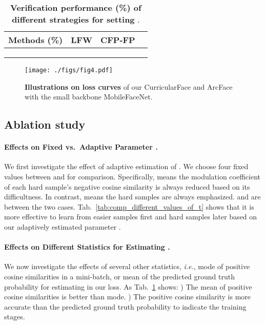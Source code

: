 \documentclass[10pt,twocolumn,letterpaper]{article}
\begin{document}
\begin{table}[t!]
\begin{center}
\small
\caption{\small \textbf{Verification performance (\%) of different strategies for setting }.}
\label{tab:comp_different_strategies_of_t}
\begin{tabular}{l|ccc}
\hline
Methods (\%)           & LFW  & CFP-FP  \\ \hline\hline
   &  &  \\
               &  &   \\
   &  &  \\\hline
\end{tabular}
\end{center}
\end{table}

\begin{figure}[t]
  \centering
  \texttt{[image: ./figs/fig4.pdf]}
\caption{\small
\textbf{Illustrations on loss curves} of our CurricularFace and ArcFace with the small backbone MobileFaceNet.
  }
  \label{fig:small_backbone}
\end{figure}

\subsection{Ablation study}
\paragraph{Effects on Fixed vs.~Adaptive Parameter .}
We first investigate the effect of adaptive estimation of .
We choose four fixed values between  and  for comparison.
Specifically,  means the modulation coefficient  of each hard sample's negative cosine similarity is always reduced based on its difficultness.
In contrast,  means the hard samples are always emphasized.
 and  are between the two cases.
Tab.~\ref{tab:comp_different_values_of_t} shows that it is more effective to learn from easier samples first and hard samples later based on our adaptively estimated parameter .

\paragraph{Effects on Different Statistics for Estimating .}
We now investigate the effects of several other statistics, \textit{i.e.}, mode of positive cosine similarities in a mini-batch, or mean of the predicted ground truth probability for estimating  in our loss.
As Tab.~\ref{tab:comp_different_strategies_of_t} shows: 
) The mean of positive cosine similarities is better than mode.
) The positive cosine similarity is more accurate than the predicted ground truth probability to indicate the training stages.
\end{document}
